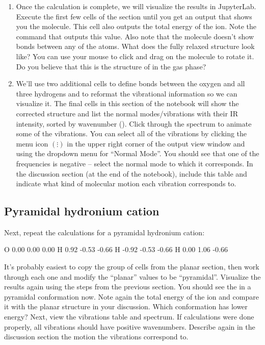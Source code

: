 \begin{enumerate}
  \item Once the calculation is complete, we will visualize the results in JupyterLab. 
  Execute the first few cells of the section until you get an output that shows you the molecule. 
  This cell also outputs the total energy of the ion. 
  Note the command that outputs this value. 
  Also note that the molecule doesn't show bonds between any of the atoms. 
  What does the fully relaxed structure look like? 
  You can use your mouse to click and drag on the molecule to rotate it. 
  Do you believe that this is the structure of  in the gas phase? 
  
  \item We'll use two additional cells to define bonds between the oxygen and all three hydrogens and to reformat the vibrational information so we can visualize it. 
  The final cells in this section of the notebook will show the corrected structure and list the normal modes/vibrations with their IR intensity, sorted by wavenumber (\unit{\wn}). 
  Click through the spectrum to animate some of the vibrations. 
  You can select all of the vibrations by clicking the menu icon \( (\vdots) \) in the upper right corner of the output view window and using the dropdown menu for ``Normal Mode''. 
  You should see that one of the frequencies is negative -- select the normal mode to which it corresponds. 
  In the discussion section (at the end of the notebook), include this table and indicate what kind of molecular motion each vibration corresponds to. 

\end{enumerate}


\subsection*{Pyramidal hydronium cation}

Next, repeat the calculations for a pyramidal hydronium cation: 
\begin{geominput}[title=Contents of \Verb{geom_pyramidal.xyz}]
O    0.00   0.00   0.00 
H    0.92  -0.53  -0.66 
H   -0.92  -0.53  -0.66 
H    0.00   1.06  -0.66 

\end{geominput}
It's probably easiest to copy the group of cells from the planar section, then work through each one and modify the ``planar'' values to be ``pyramidal''. 
Visualize the results again using the steps from the previous section. 
You should see the  in a pyramidal conformation now.  
Note again the total energy of the ion and compare it with the planar structure in your discussion. 
Which conformation has lower energy? 
Next, view the vibrations table and spectrum. 
If calculations were done properly, all vibrations should have positive wavenumbers. 
Describe again in the discussion section the motion the vibrations correspond to. 

